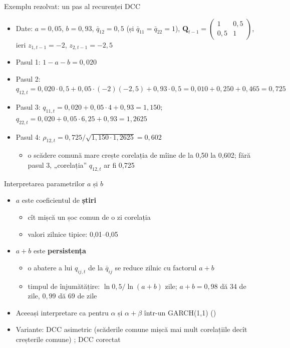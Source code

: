 \begin{frame}{Exemplu rezolvat: un pas al recurenței DCC}
\itemsize{\footnotesize}
\begin{itemize}
    \item Date: $a = 0{,}05$, $b = 0{,}93$, $\bar q_{12} = 0{,}5$ (și $\bar q_{11} = \bar q_{22} = 1$), $\mathbf{Q}_{t-1} = \begin{pmatrix}1 & 0{,}5\\ 0{,}5 & 1\end{pmatrix}$, ieri $z_{1,t-1} = -2$, $z_{2,t-1} = -2{,}5$
    \item Pasul 1: $1 - a - b = 0{,}020$
    \item Pasul 2: $q_{12,t} = 0{,}020 \cdot 0{,}5 + 0{,}05 \cdot (-2)(-2{,}5) + 0{,}93 \cdot 0{,}5 = 0{,}010 + 0{,}250 + 0{,}465 = 0{,}725$
    \item Pasul 3: $q_{11,t} = 0{,}020 + 0{,}05 \cdot 4 + 0{,}93 = 1{,}150$; \quad $q_{22,t} = 0{,}020 + 0{,}05 \cdot 6{,}25 + 0{,}93 = 1{,}2625$
    \item Pasul 4: $\rho_{12,t} = 0{,}725/\sqrt{1{,}150 \cdot 1{,}2625} = 0{,}602$
    \begin{itemize}
        \item o scădere comună mare crește corelația de mîine de la 0,50 la 0{,}602; fără pasul 3, „corelația” $q_{12,t}$ ar fi 0{,}725
    \end{itemize}
\end{itemize}
\end{frame}

\begin{frame}{Interpretarea parametrilor $a$ și $b$}
\itemsize{\small}
\begin{itemize}
    \item $a$ este coeficientul de \textbf{știri}
    \begin{itemize}
        \item cît mișcă un șoc comun de o zi corelația
        \item valori zilnice tipice: 0,01--0,05
    \end{itemize}
    \item $a + b$ este \textbf{persistența}
    \begin{itemize}
        \item o abatere a lui $q_{ij,t}$ de la $\bar q_{ij}$ se reduce zilnic cu factorul $a + b$
        \item timpul de înjumătățire: $\ln 0{,}5/\ln(a + b)$ zile; $a + b = 0{,}98$ dă 34 de zile, $0{,}99$ dă 69 de zile
    \end{itemize}
    \item Aceeași interpretare ca pentru $\alpha$ și $\alpha + \beta$ într-un GARCH(1,1) ()
    \item Variante: DCC asimetric (scăderile comune mișcă mai mult corelațiile decît creșterile comune) ; DCC corectat 
\end{itemize}
\end{frame}

